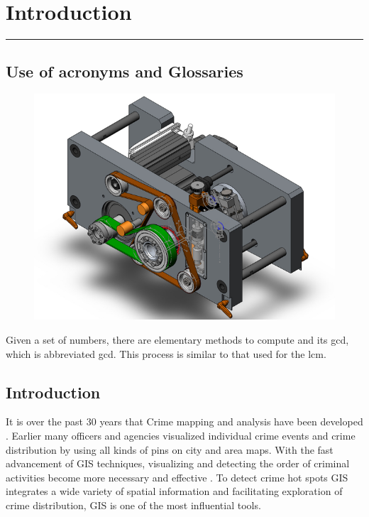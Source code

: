 \chapter{Introduction}\hrule
\label{Chapter:1}

\section{Use of acronyms and Glossaries}

\begin{figure}
\centering
\includegraphics[width=0.7\linewidth]{./images/HCutter640}
\caption{}
\label{fig:HCutter640}
\end{figure}

Given a set of numbers, there are elementary methods to compute \cite{Ansar2003} and \cite{Backus1977}
its \acrlong{gcd}, which is abbreviated \acrshort{gcd}. This 
process is similar to that used for the \acrfull{lcm}.
\section{Introduction}
It is over the past 30 years that Crime mapping and analysis have been developed \citep{Ansar2003}. Earlier many officers and agencies visualized individual crime events and crime distribution by using all kinds of pins on city and area maps. With the fast advancement of GIS techniques, visualizing and detecting the order of criminal activities become more necessary and effective \citep{Shannon1949}. To detect crime hot spots GIS integrates a wide variety of spatial information and facilitating exploration of crime distribution, GIS is one of the most influential tools.

